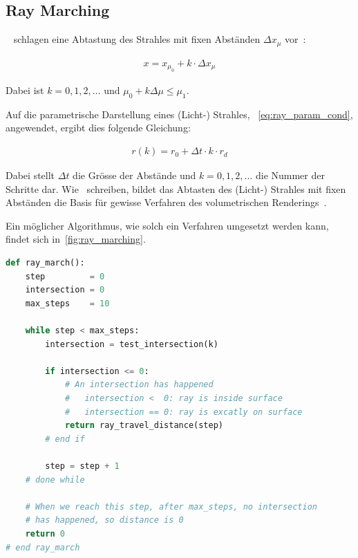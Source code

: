 
\subsection{Ray Marching}
\label{subsec:ray_marching}

~\citeauthor{perlin_hypertexture_1989} schlagen eine Abtastung des
Strahles mit fixen Abständen $\Delta{x_{\mu}}$ vor~\parencite[S.
259]{perlin_hypertexture_1989}:

\begin{gather}
    x = x_{\mu_{0}} + k \cdot \Delta x_{\mu}
\end{gather}

Dabei ist $k = 0,1,2,\dots$ und $\mu_{0} + k \Delta \mu \leq \mu_{1}$.

Auf die parametrische Darstellung eines (Licht-) Strahles,
~\autoref{eq:ray_param_cond}, angewendet, ergibt dies folgende Gleichung:

\begin{gather}
    r(k) = r_{0} + \Delta t \cdot k \cdot r_{d}
\end{gather}

Dabei stellt $\Delta t$ die Grösse der Abstände und $k = 0,1,2,\dots$ die Nummer der
Schritte dar. Wie~\citeauthor{hart_ray_1989} schreiben, bildet das Abtasten des
(Licht-) Strahles mit fixen Abständen die Basis für gewisse Verfahren des
volumetrischen Renderings~\parencite[S. 291]{hart_ray_1989}.

Ein möglicher Algorithmus, wie solch ein Verfahren umgesetzt werden kann,
findet sich in~\autoref{fig:ray_marching}.

\begin{minipage}{\linewidth}
\begin{lstlisting}[language=Python,caption={Eine abstrakte Umsetzung des Ray
        Marchings\protect\footnotemark.},label={fig:ray_marching},captionpos=b,emph={ray_march}]
def ray_march():
    step         = 0
    intersection = 0
    max_steps    = 10

    while step < max_steps:
        intersection = test_intersection(k)

        if intersection <= 0:
            # An intersection has happened
            #   intersection <  0: ray is inside surface
            #   intersection == 0: ray is excatly on surface
            return ray_travel_distance(step)
        # end if

        step = step + 1
    # done while

    # When we reach this step, after max_steps, no intersection
    # has happened, so distance is 0
    return 0
# end ray_march
\end{lstlisting}
\end{minipage}

